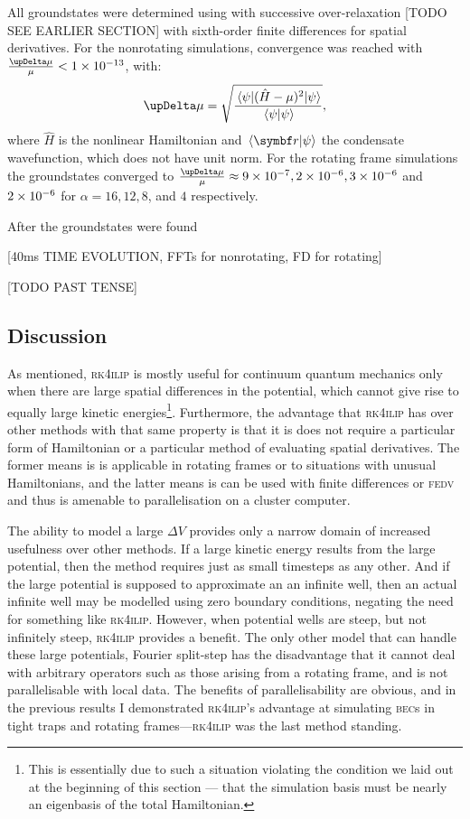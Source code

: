 All groundstates were determined using with successive over-relaxation [TODO SEE EARLIER SECTION] with sixth-order finite differences for spatial derivatives. For the nonrotating simulations, convergence was reached with $\frac{\upDelta\mu}{\mu} < 1\E{-13}$, with:
\begin{equation}
\upDelta\mu = \sqrt{\frac{\matrixel{\psi} {(\hat H - \mu)^2}{\psi}}{\braket {\psi}{\psi}}},
\end{equation}
where $\hat H$ is the nonlinear Hamiltonian and $\braket{\vec r}{\psi}$ the condensate wavefunction, which does not have unit norm. For the rotating frame simulations the groundstates converged to $\frac{\upDelta\mu}{\mu} \approx 9\E{-7}, 2\E{-6}, 3\E{-6}$ and $2\times 10^{-6}$ for $\alpha = 16, 12, 8$, and $4$ respectively.

After the groundstates were found

[40ms TIME EVOLUTION, FFTs for nonrotating, FD for rotating]

[TODO PAST TENSE]

\subsection{Discussion}

As mentioned, \textsc{rk4ilip} is mostly useful for continuum quantum mechanics only when there are large spatial differences in the potential, which cannot give rise to equally large kinetic energies\footnote{This is essentially due to such a situation violating the condition we laid out at the beginning of this section --- that the simulation basis must be nearly an eigenbasis of the total Hamiltonian.}. Furthermore, the advantage that \textsc{rk4ilip} has over other methods with that same property is that it is does not require a particular form of Hamiltonian or a particular method of evaluating spatial derivatives. The former means is is applicable in rotating frames or to situations with unusual Hamiltonians, and the latter means is can be used with finite differences or \textsc{fedv} and thus is amenable to parallelisation on a cluster computer.

The ability to model a large $\Delta V$ provides only a narrow domain of increased usefulness over other methods. If a large kinetic energy results from the large potential, then the method requires just as small timesteps as any other. And if the large potential is supposed to approximate an an infinite well, then an actual infinite well may be modelled using zero boundary conditions, negating the need for something like \textsc{rk4ilip}. However, when potential wells are steep, but not infinitely steep, \textsc{rk4ilip} provides a benefit. The only other model that can handle these large potentials, Fourier split-step has the disadvantage that it cannot deal with arbitrary operators such as those arising from a rotating frame, and is not parallelisable with local data. The benefits of parallelisability are obvious, and in the previous results I demonstrated \textsc{rk4ilip}'s advantage at simulating \textsc{bec}s in tight traps and rotating frames---\textsc{rk4ilip} was the last method standing.
